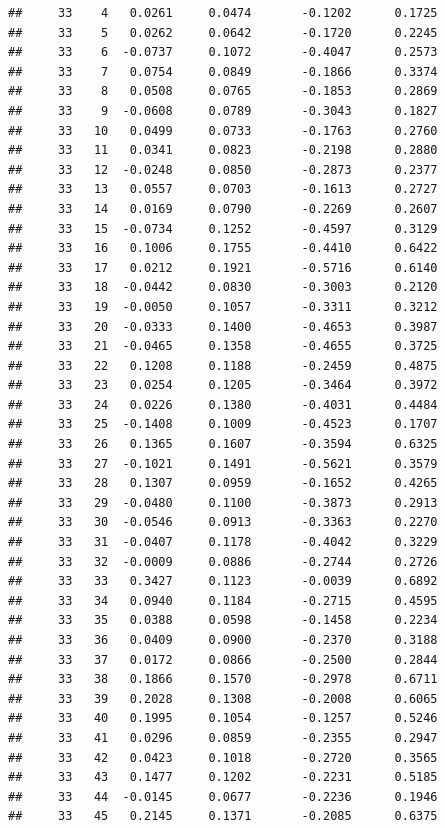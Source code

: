 \documentclass[
]{article}
\begin{document}
\begin{verbatim}
##     33    4   0.0261     0.0474       -0.1202      0.1725  
##     33    5   0.0262     0.0642       -0.1720      0.2245  
##     33    6  -0.0737     0.1072       -0.4047      0.2573  
##     33    7   0.0754     0.0849       -0.1866      0.3374  
##     33    8   0.0508     0.0765       -0.1853      0.2869  
##     33    9  -0.0608     0.0789       -0.3043      0.1827  
##     33   10   0.0499     0.0733       -0.1763      0.2760  
##     33   11   0.0341     0.0823       -0.2198      0.2880  
##     33   12  -0.0248     0.0850       -0.2873      0.2377  
##     33   13   0.0557     0.0703       -0.1613      0.2727  
##     33   14   0.0169     0.0790       -0.2269      0.2607  
##     33   15  -0.0734     0.1252       -0.4597      0.3129  
##     33   16   0.1006     0.1755       -0.4410      0.6422  
##     33   17   0.0212     0.1921       -0.5716      0.6140  
##     33   18  -0.0442     0.0830       -0.3003      0.2120  
##     33   19  -0.0050     0.1057       -0.3311      0.3212  
##     33   20  -0.0333     0.1400       -0.4653      0.3987  
##     33   21  -0.0465     0.1358       -0.4655      0.3725  
##     33   22   0.1208     0.1188       -0.2459      0.4875  
##     33   23   0.0254     0.1205       -0.3464      0.3972  
##     33   24   0.0226     0.1380       -0.4031      0.4484  
##     33   25  -0.1408     0.1009       -0.4523      0.1707  
##     33   26   0.1365     0.1607       -0.3594      0.6325  
##     33   27  -0.1021     0.1491       -0.5621      0.3579  
##     33   28   0.1307     0.0959       -0.1652      0.4265  
##     33   29  -0.0480     0.1100       -0.3873      0.2913  
##     33   30  -0.0546     0.0913       -0.3363      0.2270  
##     33   31  -0.0407     0.1178       -0.4042      0.3229  
##     33   32  -0.0009     0.0886       -0.2744      0.2726  
##     33   33   0.3427     0.1123       -0.0039      0.6892  
##     33   34   0.0940     0.1184       -0.2715      0.4595  
##     33   35   0.0388     0.0598       -0.1458      0.2234  
##     33   36   0.0409     0.0900       -0.2370      0.3188  
##     33   37   0.0172     0.0866       -0.2500      0.2844  
##     33   38   0.1866     0.1570       -0.2978      0.6711  
##     33   39   0.2028     0.1308       -0.2008      0.6065  
##     33   40   0.1995     0.1054       -0.1257      0.5246  
##     33   41   0.0296     0.0859       -0.2355      0.2947  
##     33   42   0.0423     0.1018       -0.2720      0.3565  
##     33   43   0.1477     0.1202       -0.2231      0.5185  
##     33   44  -0.0145     0.0677       -0.2236      0.1946  
##     33   45   0.2145     0.1371       -0.2085      0.6375  

\end{verbatim}
\end{document}

